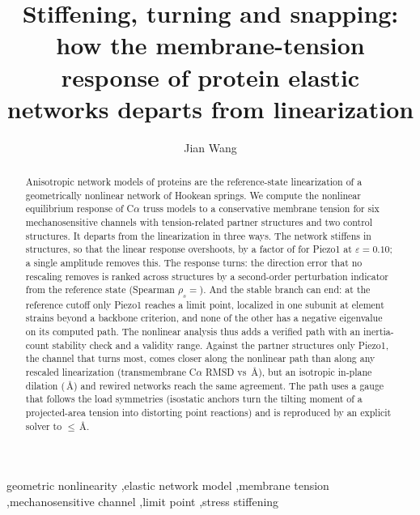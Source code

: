 \documentclass[preprint,12pt,a4paper]{elsarticle}
\newcommand{\eps}{\varepsilon}
\begin{document}
\begin{frontmatter}
\title{Stiffening, turning and snapping: how the membrane-tension response of protein elastic networks departs from linearization}
\author[a]{Jian Wang}
\address[a]{[AFFILIATION TO CONFIRM: department, institution, city, postal code, country]}

\begin{abstract}
Anisotropic network models of proteins are the reference-state linearization of a geometrically nonlinear network of Hookean springs. We compute the nonlinear equilibrium response of C$\alpha$ truss models to a conservative membrane tension for six mechanosensitive channels with tension-related partner structures and two control structures. It departs from the linearization in three ways. The network stiffens in  structures, so that the linear response overshoots, by a factor of  for Piezo1 at $\eps=0.10$; a single amplitude removes this. The response turns: the direction error that no rescaling removes is ranked across structures by a second-order perturbation indicator from the reference state (Spearman $\rho_s=$). And the stable branch can end: at the reference cutoff only Piezo1 reaches a limit point, localized in one subunit at element strains beyond a backbone criterion, and none of the other  has a negative eigenvalue on its computed path. The nonlinear analysis thus adds a verified path with an inertia-count stability check and a validity range. Against the partner structures only Piezo1, the channel that turns most, comes closer along the nonlinear path than along any rescaled linearization (transmembrane C$\alpha$ RMSD  vs \,\AA), but an isotropic in-plane dilation (\,\AA) and rewired networks reach the same agreement. The path uses a gauge that follows the load symmetries (isostatic anchors turn the tilting moment of a projected-area tension into distorting point reactions) and is reproduced by an explicit solver to $\le$\,\AA.
\end{abstract}

\begin{keyword}
geometric nonlinearity \sep elastic network model \sep membrane tension \sep mechanosensitive channel \sep limit point \sep stress stiffening
\end{keyword}
\end{frontmatter}
\linenumbers
\end{document}
